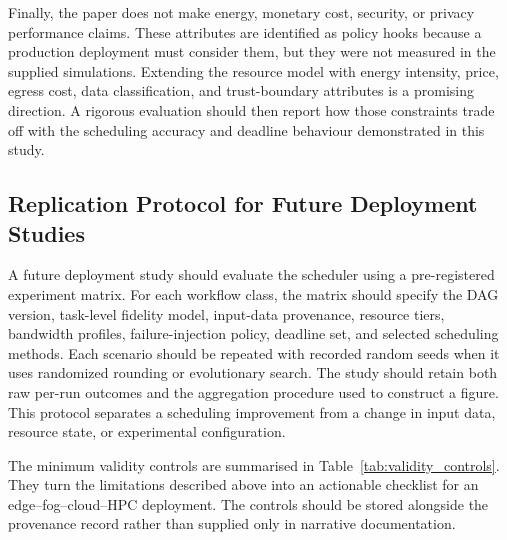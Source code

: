 Finally, the paper does not make energy, monetary cost, security, or privacy performance claims. These attributes are identified as policy hooks because a production deployment must consider them, but they were not measured in the supplied simulations. Extending the resource model with energy intensity, price, egress cost, data classification, and trust-boundary attributes is a promising direction. A rigorous evaluation should then report how those constraints trade off with the scheduling accuracy and deadline behaviour demonstrated in this study.


\subsection{Replication Protocol for Future Deployment Studies}

A future deployment study should evaluate the scheduler using a pre-registered experiment matrix. For each workflow class, the matrix should specify the DAG version, task-level fidelity model, input-data provenance, resource tiers, bandwidth profiles, failure-injection policy, deadline set, and selected scheduling methods. Each scenario should be repeated with recorded random seeds when it uses randomized rounding or evolutionary search. The study should retain both raw per-run outcomes and the aggregation procedure used to construct a figure. This protocol separates a scheduling improvement from a change in input data, resource state, or experimental configuration.

The minimum validity controls are summarised in Table~\ref{tab:validity_controls}. They turn the limitations described above into an actionable checklist for an edge--fog--cloud--HPC deployment. The controls should be stored alongside the provenance record rather than supplied only in narrative documentation.

